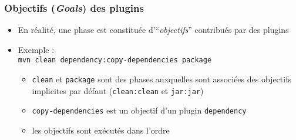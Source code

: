 \documentclass{beamer}
\begin{document}
\begin{frame}[fragile]
  \frametitle{Objectifs (\textit{Goals}) des plugins}
\begin{itemize}
\item En réalité, une phase est constituée d'``\textit{objectifs}''
  contribués par des plugins
\item Exemple :\\ \texttt{mvn clean dependency:copy-dependencies package}
  \begin{itemize}
  \item \texttt{clean} et \texttt{package} sont des phases auxquelles
    sont associées des objectifs implicites par défaut
    (\texttt{clean:clean} et \texttt{jar:jar})
  \item \texttt{copy-dependencies} est un objectif d'un plugin
    \texttt{dependency}
  \item les objectifs sont exécutés dans l'ordre
\end{itemize}
\end{itemize}
\end{frame}
\end{document}
